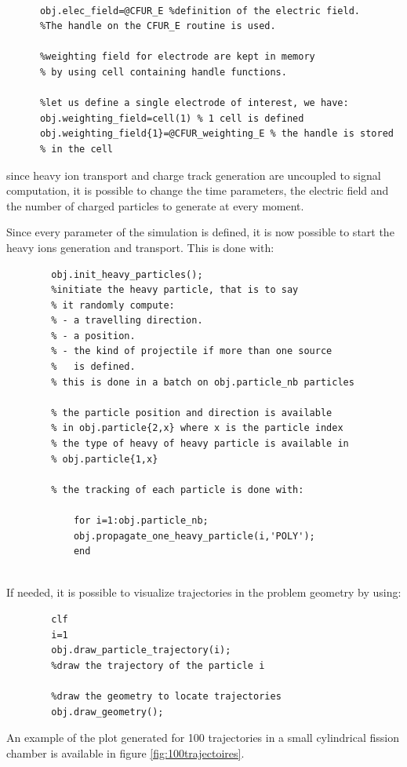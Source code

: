 \documentclass[10pt]{article}
\begin{document}
	  \begin{lstlisting}
	  
	  obj.elec_field=@CFUR_E %definition of the electric field.
	  %The handle on the CFUR_E routine is used.
	  
	  %weighting field for electrode are kept in memory
	  % by using cell containing handle functions.
	  
	  %let us define a single electrode of interest, we have:
	  obj.weighting_field=cell(1) % 1 cell is defined
	  obj.weighting_field{1}=@CFUR_weighting_E % the handle is stored 
	  % in the cell
	  \end{lstlisting}
	  
	  since heavy ion transport and charge track generation are uncoupled to signal computation, it is possible to change the time parameters, the electric field and the number of charged particles to generate at every moment.
	
		Since every parameter of the simulation is defined, it is now possible to start the heavy ions generation and transport. This is done with:
		
		\begin{lstlisting}
		obj.init_heavy_particles(); 
		%initiate the heavy particle, that is to say
		% it randomly compute:
		% - a travelling direction.
		% - a position.
		% - the kind of projectile if more than one source
		%   is defined. 
		% this is done in a batch on obj.particle_nb particles
		
		% the particle position and direction is available
		% in obj.particle{2,x} where x is the particle index
		% the type of heavy of heavy particle is available in
		% obj.particle{1,x}
		
		% the tracking of each particle is done with:
			
			for i=1:obj.particle_nb;
			obj.propagate_one_heavy_particle(i,'POLY');
			end
		
		\end{lstlisting}
		
		If needed, it is possible to visualize trajectories in the problem geometry by using:
		
		\begin{lstlisting}
		clf 
		i=1
		obj.draw_particle_trajectory(i);
		%draw the trajectory of the particle i
		
		%draw the geometry to locate trajectories
		obj.draw_geometry();
		\end{lstlisting}
		An example of the plot generated for 100 trajectories in a small cylindrical fission chamber is available in figure \ref{fig:100trajectoires}.
		
\end{document}
